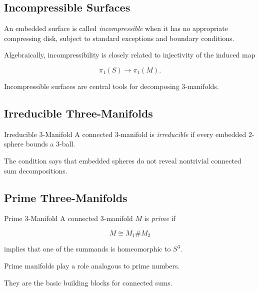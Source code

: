 \subsection{Incompressible Surfaces}
\label{subsec:incompressible-surfaces}

An embedded surface is called \emph{incompressible} when it has no
appropriate compressing disk, subject to standard exceptions and boundary
conditions.

Algebraically, incompressibility is closely related to injectivity of the
induced map

\[
\boxed{
\pi_1(S)\to\pi_1(M).
}
\]

Incompressible surfaces are central tools for decomposing \(3\)-manifolds.

\subsection{Irreducible Three-Manifolds}
\label{subsec:irreducible-three-manifolds}

\begin{definitionbox}{Irreducible \(3\)-Manifold}
A connected \(3\)-manifold is \emph{irreducible} if every embedded
\(2\)-sphere bounds a \(3\)-ball.
\end{definitionbox}

The condition says that embedded spheres do not reveal nontrivial connected
sum decompositions.

\subsection{Prime Three-Manifolds}
\label{subsec:prime-three-manifolds}

\begin{definitionbox}{Prime \(3\)-Manifold}
A connected \(3\)-manifold \(M\) is \emph{prime} if

\[
M\cong M_1\#M_2
\]

implies that one of the summands is homeomorphic to \(S^3\).
\end{definitionbox}

Prime manifolds play a role analogous to prime numbers.

They are the basic building blocks for connected sums.

